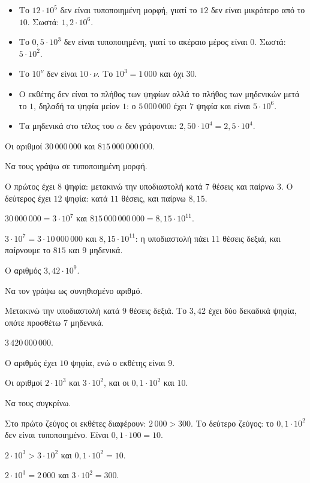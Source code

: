 \begin{prosoxi}
\begin{itemize}[leftmargin=1.2em,itemsep=0.3ex,topsep=2pt]
\item Το $12\cdot10^{5}$ δεν είναι τυποποιημένη μορφή, γιατί το $12$ δεν είναι μικρότερο από το $10$. Σωστά: $1{,}2\cdot10^{6}$.
\item Το $0{,}5\cdot10^{3}$ δεν είναι τυποποιημένη, γιατί το ακέραιο μέρος είναι $0$. Σωστά: $5\cdot10^{2}$.
\item Το $10^{\nu}$ δεν είναι $10\cdot\nu$. Το $10^{3}=1\,000$ και όχι $30$.
\item Ο εκθέτης δεν είναι το πλήθος των ψηφίων αλλά το πλήθος των μηδενικών μετά το $1$, δηλαδή τα ψηφία μείον $1$: ο $5\,000\,000$ έχει $7$ ψηφία και είναι $5\cdot10^{6}$.
\item Τα μηδενικά στο τέλος του $\alpha$ δεν γράφονται: $2{,}50\cdot10^4=2{,}5\cdot10^4$.
\end{itemize}
\end{prosoxi}


\tixero Οι αριθμοί $30\,000\,000$ και $815\,000\,000\,000$.\par
\tithelo Να τους γράψω σε τυποποιημένη μορφή.\par
\possindeo Ο πρώτος έχει $8$ ψηφία: μετακινώ την υποδιαστολή κατά $7$ θέσεις και παίρνω $3$. Ο δεύτερος έχει $12$ ψηφία: κατά $11$ θέσεις, και παίρνω $8{,}15$.\par
\apantisi $30\,000\,000=3\cdot10^{7}$ και $815\,000\,000\,000=8{,}15\cdot10^{11}$.\par
\elegxos $3\cdot10^{7}=3\cdot10\,000\,000$ και $8{,}15\cdot10^{11}$: η υποδιαστολή πάει $11$ θέσεις δεξιά, και παίρνουμε το $815$ και $9$ μηδενικά.

\tixero Ο αριθμός $3{,}42\cdot10^{9}$.\par
\tithelo Να τον γράψω ως συνηθισμένο αριθμό.\par
\possindeo Μετακινώ την υποδιαστολή κατά $9$ θέσεις δεξιά. Το $3{,}42$ έχει δύο δεκαδικά ψηφία, οπότε προσθέτω $7$ μηδενικά.\par
\apantisi $3\,420\,000\,000$.\par
\elegxos Ο αριθμός έχει $10$ ψηφία, ενώ ο εκθέτης είναι $9$.

\tixero Οι αριθμοί $2\cdot10^{3}$ και $3\cdot10^{2}$, και οι $0{,}1\cdot10^{2}$ και $10$.\par
\tithelo Να τους συγκρίνω.\par
\possindeo Στο πρώτο ζεύγος οι εκθέτες διαφέρουν: $2\,000>300$. Το δεύτερο ζεύγος: το $0{,}1\cdot10^{2}$ δεν είναι τυποποιημένο. Είναι $0{,}1\cdot100=10$.\par
\apantisi $2\cdot10^{3}>3\cdot10^{2}$ και $0{,}1\cdot10^{2}=10$.\par
\elegxos $2\cdot10^3=2\,000$ και $3\cdot10^2=300$.

